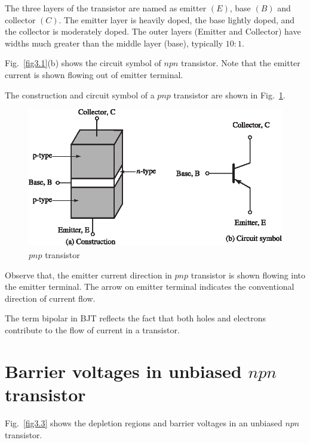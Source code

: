 \vfill\eject

The three layers of the transistor are named as emitter $(E)$, base $(B)$ and collector $(C)$. The emitter layer is heavily doped, the base lightly doped, and the collector is moderately doped. The outer layers (Emitter and Collector) have widths much greater than the middle layer (base), typically $10:1$.

Fig.~\ref{fig3.1}(b) shows the circuit symbol of $npn$ transistor. Note that the emitter current is shown flowing out of emitter terminal.

The construction and circuit symbol of a $pnp$ transistor are shown in Fig.~\ref{fig3.2}.
\begin{figure}[H]
\centering
\includegraphics{chap2/S3-EE-03-002.eps}
\caption{$pnp$ transistor}\label{fig3.2}
\end{figure}

Observe that, the emitter current direction in $pnp$ transistor is shown flowing into the emitter terminal. The arrow on emitter terminal indicates the conventional direction of current flow.

The term bipolar in BJT reflects the fact that both holes and electrons contribute to the flow of current in a transistor.

\section[Barrier voltages in unbiased $npn$ transistor]{Barrier voltages in unbiased \boldmath$npn$ transistor}\label{sec3.2}

Fig.~\ref{fig3.3} shows the depletion regions and barrier voltages in an unbiased $npn$ transistor.

